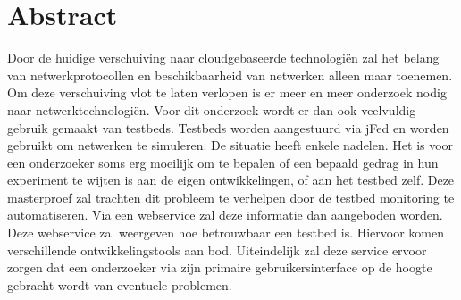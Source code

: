 \newpage
\chapter*{Abstract}
\npar
Door de huidige verschuiving naar cloudgebaseerde technologi\"en zal het belang 
van netwerkprotocollen en beschikbaarheid van netwerken alleen maar toenemen.
Om deze verschuiving vlot te laten verlopen is er meer en meer onderzoek nodig naar netwerktechnologi\"en.
Voor dit onderzoek wordt er dan ook veelvuldig gebruik gemaakt van testbeds.
Testbeds worden aangestuurd via jFed en worden gebruikt om netwerken te simuleren.
De situatie heeft enkele nadelen. Het is voor een onderzoeker soms erg moeilijk om te bepalen of een bepaald gedrag in hun experiment te wijten is aan de eigen ontwikkelingen, of aan het testbed zelf.
\npar
Deze masterproef zal trachten dit probleem te verhelpen door de testbed monitoring te automatiseren. Via een webservice zal deze informatie dan aangeboden worden. Deze webservice zal weergeven hoe betrouwbaar een testbed is. Hiervoor komen verschillende ontwikkelingstools aan bod. Uiteindelijk zal deze service ervoor zorgen dat een onderzoeker via zijn primaire gebruikersinterface op de hoogte gebracht wordt van eventuele problemen.